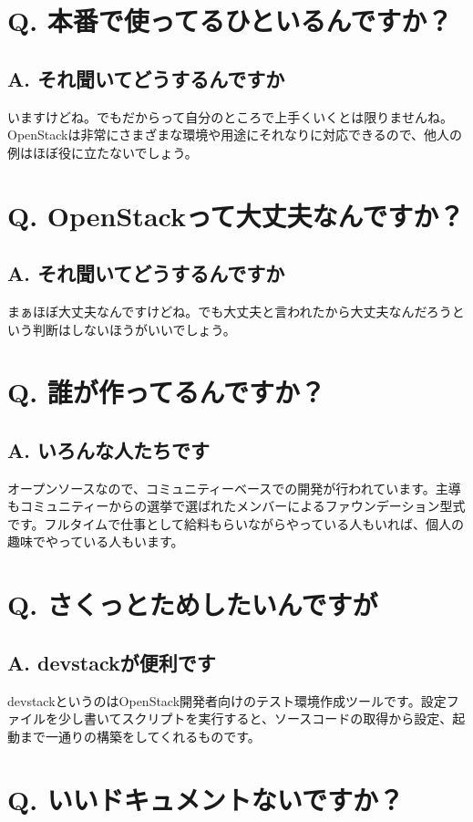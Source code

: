 \documentclass[9pt,b5paper,tombo,openany]{jsbook}
\begin{document}
\section*{Q. 本番で使ってるひといるんですか？}
\subsection*{A. それ聞いてどうするんですか}
いますけどね。でもだからって自分のところで上手くいくとは限りませんね。OpenStackは非常にさまざまな環境や用途にそれなりに対応できるので、他人の例はほぼ役に立たないでしょう。

\section*{Q. OpenStackって大丈夫なんですか？}
\subsection*{A. それ聞いてどうするんですか}
まぁほぼ大丈夫なんですけどね。でも大丈夫と言われたから大丈夫なんだろうという判断はしないほうがいいでしょう。

\section*{Q. 誰が作ってるんですか？}
\subsection*{A. いろんな人たちです}
オープンソースなので、コミュニティーベースでの開発が行われています。主導もコミュニティーからの選挙で選ばれたメンバーによるファウンデーション型式です。フルタイムで仕事として給料もらいながらやっている人もいれば、個人の趣味でやっている人もいます。

\section*{Q. さくっとためしたいんですが}
\subsection*{A. devstackが便利です}
devstackというのはOpenStack開発者向けのテスト環境作成ツールです。設定ファイルを少し書いてスクリプトを実行すると、ソースコードの取得から設定、起動まで一通りの構築をしてくれるものです。

\section*{Q. いいドキュメントないですか？}
\end{document}
